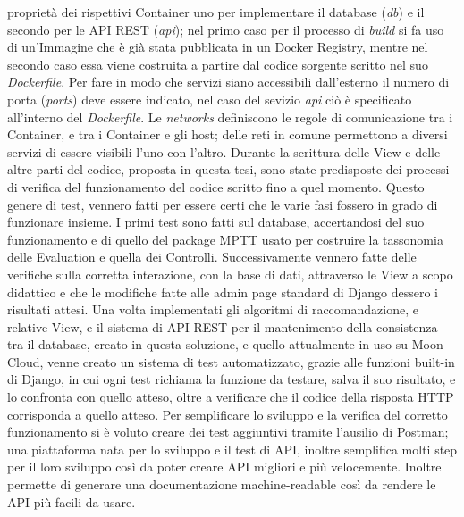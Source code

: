 proprietà dei rispettivi Container uno per implementare il database (\textit{db}) e il secondo per le API REST (\textit{api}); nel primo caso per il 
processo di \textit{build} si fa uso di un'Immagine che è già stata pubblicata in un Docker Registry, mentre nel secondo caso essa viene costruita 
a partire dal codice sorgente scritto nel suo \textit{Dockerfile}. Per fare in modo che servizi siano accessibili dall'esterno il numero di porta 
(\textit{ports}) deve essere indicato, nel caso del sevizio \textit{api} ciò è specificato all'interno del \textit{Dockerfile}.\hfill\break
Le \textit{networks} definiscono le regole di comunicazione tra i Container, e tra i Container e gli host; delle reti in comune 
permettono a diversi servizi di essere visibili l'uno con l'altro.
%
\vspace{1.5 cm}
\hfill\break
Durante la scrittura delle View e delle altre parti del codice, proposta in questa tesi, sono state predisposte 
dei processi di verifica del funzionamento del codice scritto fino a quel momento. Questo genere di test, vennero fatti 
per essere certi che le varie fasi fossero in grado di funzionare insieme.\hfill\break
I primi test sono fatti sul database, accertandosi del suo funzionamento e di quello del package MPTT usato 
per costruire la tassonomia delle Evaluation e quella dei Controlli. Successivamente vennero fatte delle verifiche sulla 
corretta interazione, con la base di dati, attraverso le View a scopo didattico e che le modifiche fatte alle admin page 
standard di Django dessero i risultati attesi. Una volta implementati gli algoritmi di raccomandazione, e relative View, 
e il sistema di API REST per il mantenimento della consistenza tra il database, creato in questa soluzione, e quello 
attualmente in uso su Moon Cloud, venne creato un sistema di test automatizzato, grazie alle funzioni built-in di Django, 
in cui ogni test richiama la funzione da testare, salva il suo risultato, e lo confronta con quello atteso, 
oltre a verificare che il codice della risposta HTTP corrisponda a quello atteso.\hfill\break
Per semplificare lo sviluppo e la verifica del corretto funzionamento si è voluto creare dei test aggiuntivi tramite 
l'ausilio di Postman; una piattaforma nata per lo sviluppo e il test di API, inoltre semplifica molti step per il loro 
sviluppo così da poter creare API migliori e più velocemente. Inoltre permette di generare una documentazione 
machine-readable così da rendere le API più facili da usare.
